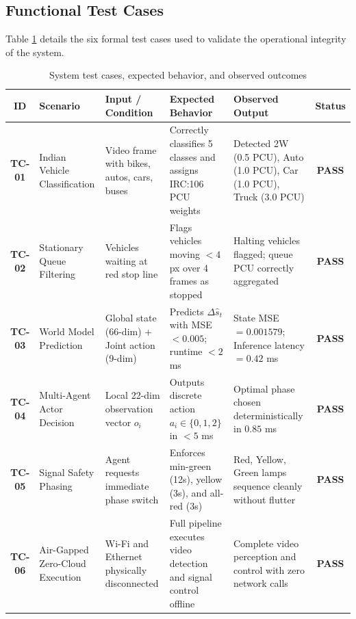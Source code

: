 \documentclass[12pt,a4paper,oneside]{report}
\begin{document}
\subsection{Functional Test Cases}
Table \ref{tab:ch4_test_cases} details the six formal test cases used to validate the operational integrity of the system.

\begin{table}[htbp]
\centering
\scriptsize
\setlength{\tabcolsep}{3pt}
\caption{System test cases, expected behavior, and observed outcomes}
\label{tab:ch4_test_cases}
\begin{tabularx}{\textwidth}{|c|p{2.2cm}|p{2.6cm}|p{2.8cm}|p{3.2cm}|c|}
\hline
\textbf{ID} & \textbf{Scenario} & \textbf{Input / Condition} & \textbf{Expected Behavior} & \textbf{Observed Output} & \textbf{Status} \\ \hline
\textbf{TC-01} & Indian Vehicle Classification & Video frame with bikes, autos, cars, buses & Correctly classifies 5 classes and assigns IRC:106 PCU weights & Detected 2W (0.5 PCU), Auto (1.0 PCU), Car (1.0 PCU), Truck (3.0 PCU) & \textbf{PASS} \\ \hline
\textbf{TC-02} & Stationary Queue Filtering & Vehicles waiting at red stop line & Flags vehicles moving $< 4$ px over 4 frames as stopped & Halting vehicles flagged; queue PCU correctly aggregated & \textbf{PASS} \\ \hline
\textbf{TC-03} & World Model Prediction & Global state (66-dim) + Joint action (9-dim) & Predicts $\Delta \hat{s}_t$ with MSE $< 0.005$; runtime $< 2$ ms & State MSE $= 0.001579$; Inference latency $= 0.42$ ms & \textbf{PASS} \\ \hline
\textbf{TC-04} & Multi-Agent Actor Decision & Local 22-dim observation vector $o_i$ & Outputs discrete action $a_i \in \{0, 1, 2\}$ in $< 5$ ms & Optimal phase chosen deterministically in $0.85$ ms & \textbf{PASS} \\ \hline
\textbf{TC-05} & Signal Safety Phasing & Agent requests immediate phase switch & Enforces min-green (12s), yellow (3s), and all-red (3s) & Red, Yellow, Green lamps sequence cleanly without flutter & \textbf{PASS} \\ \hline
\textbf{TC-06} & Air-Gapped Zero-Cloud Execution & Wi-Fi and Ethernet physically disconnected & Full pipeline executes video detection and signal control offline & Complete video perception and control with zero network calls & \textbf{PASS} \\ \hline
\end{tabularx}
\end{table}
\end{document}
